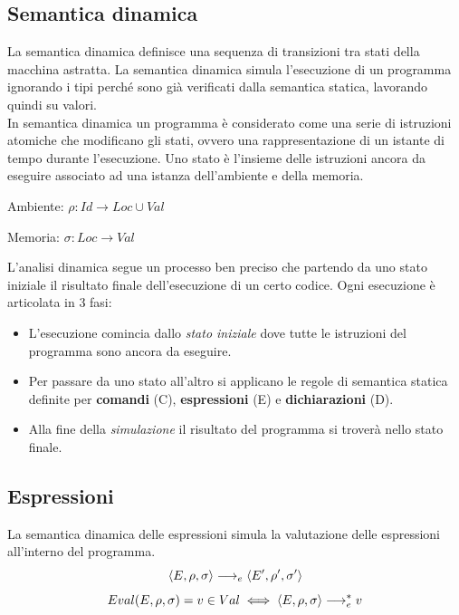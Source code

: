\documentclass{article}
\begin{document}
\subsection{Semantica dinamica}
La semantica dinamica definisce una sequenza di transizioni tra stati della macchina astratta. La semantica dinamica simula l'esecuzione di un programma ignorando i tipi perché sono già verificati dalla semantica statica, lavorando quindi su valori. \\
In semantica dinamica un programma è considerato come una serie di istruzioni atomiche che modificano gli stati, ovvero una rappresentazione di un istante di tempo durante l'esecuzione. Uno stato è l'insieme delle istruzioni ancora da eseguire associato ad una istanza dell'ambiente e della memoria.
\begin{dfn}{Ambiente: }
  \(\rho: Id \rightarrow Loc \cup Val\)
\end{dfn}
\begin{dfn}{Memoria: }
  \(\sigma: Loc \rightarrow Val\)
\end{dfn}
L'analisi dinamica segue un processo ben preciso che partendo da uno stato iniziale  il risultato finale dell'esecuzione di un certo codice. Ogni esecuzione è articolata in 3 fasi:
\begin{itemize}
  \item L'esecuzione comincia dallo \emph{stato iniziale} dove tutte le istruzioni del programma sono ancora da eseguire.
  \item Per passare da uno stato all'altro si applicano le regole di semantica statica definite per \textbf{comandi} (C), \textbf{espressioni} (E) e \textbf{dichiarazioni} (D).
  \item Alla fine della \emph{simulazione} il risultato del programma si troverà nello stato finale.
\end{itemize}
\subsection*{Espressioni}
La semantica dinamica delle espressioni simula la valutazione delle espressioni all'interno del programma.
\[\langle E,\rho,\sigma \rangle \longrightarrow_e \langle E',\rho',\sigma' \rangle\]
\[Eval(E,\rho,\sigma) = v \in Val \iff \langle E,\rho,\sigma \rangle \longrightarrow_e^* v\]
\end{document}

